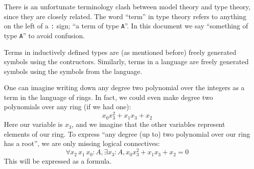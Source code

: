 \begin{rmk}
  There is an unfortunate terminology clash between model theory and type theory,
  since they are closely related.
  The word ``term'' in type theory refers to anything on the left of a \texttt{:} sign;
  ``a term of type \texttt{A}''.
  In this document we say ``something of type \texttt{A}'' to avoid confusion.

  Terms in inductively defined types are (as mentioned before)
  freely generated symbols using the contructors.
  Similarly, terms in a language are freely generated symbols using
  the symbols from the language.
\end{rmk}

One can imagine writing down any degree two polynomial over the integers
as a term in the language of rings.
In fact, we could even make degree two polynomials over any ring (if we had one):
\[ x_{0} x_{3}^{2} + x_{1} x_{3} + x_{2} \]
Here our variable is $x_{3}$, and we imagine that the other variables represent
elements of our ring.
To express ``any degree (up to) two polynomial over our ring has a root'',
we are only missing logical connectives:
\[ \forall x_{2} \, x_{1} \, x_{0} : A, \exists x_{3} : A, x_{0} x_{3}^{2} + x_{1} x_{3} + x_{2} = 0 \]
This will be expressed as a formula.

